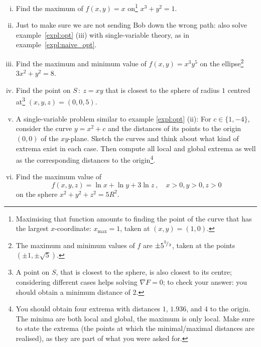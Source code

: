 \begin{exercise}
\begin{enumerate}[(i)]
	\item Find the maximum of $f(x,y)=x$ on\footnote{Maximising that function amounts to finding the point of the curve that has the largest $x$-coordinate: $x_{\text{max}}=1$, taken at $(x,y)=(1,0)$.} $x^3+y^2=1$.
	\item Just to make sure we are not sending Bob down the wrong path: also solve example~\ref{expl:opt} (iii)  with single-variable theory, as in example~\ref{expl:naive_opt}.
	\item Find the maximum and minimum value of $f(x,y)=x^3y^5$ on the ellipse\footnote{The maximum and minimum values of $f$ are $\pm5^{{}^{5}\!/_{2}}$, taken at the points $(\pm1,\pm\sqrt{5})$.} $3x^2+y^2=8.$
	\item Find the point on $S\,:\:z= xy$ that is closest to the sphere of radius $1$ centred at\footnote{A point on $S$, that is closest to the sphere, is also closest to its centre; considering different cases helps solving $\nabla F = 0$; to check your answer: you should obtain a minimum distance of $2$.} $(x,y,z)=(0,0,5)$.
	\item A single-variable problem similar to example \ref{expl:opt} (ii): For $c\in\{1,-4\}$, consider the curve $y=x^2+c$ and the distances of its points to the origin $(0,0)$ of the $xy$-plane. Sketch the curves and think about what kind of extrema exist in each case. Then compute all local and global extrema as well as the corresponding distances to the origin\footnote{You should obtain four extrema with distances $1$, $1.936$, and $4$ to the origin. The minima are both local and global, the maximum is only local. Make sure to state the extrema (the points at which the minimal/maximal distances are realised), as they are part of what you were asked for.}.
	\item Find the maximum value of 
	\[ f(x,y,z) = \ln x + \ln y + 3 \ln z \:, \quad x>0,y>0,z>0 \]
	on the sphere $x^2+y^2+z^2 = 5R^2$.
\end{enumerate}	
\end{exercise}
